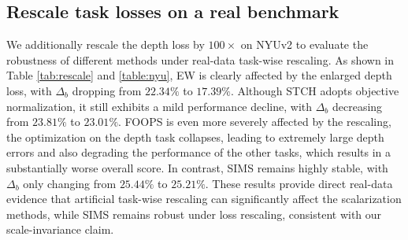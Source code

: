 \documentclass[sigconf]{acmart}
\begin{document}
\begin{add}
\subsection{Rescale task losses on a real benchmark}
We additionally rescale the depth loss by $100\times$ on NYUv2 to evaluate the robustness of different methods under real-data task-wise rescaling. As shown in Table \ref{tab:rescale} and \ref{table:nyu}, EW is clearly affected by the enlarged depth loss, with $\Delta_b$ dropping from $22.34\%$ to $17.39\%$. Although STCH adopts objective normalization, it still exhibits a mild performance decline, with $\Delta_b$ decreasing from $23.81\%$ to $23.01\%$. FOOPS is even more severely affected by the rescaling, the optimization on the depth task collapses, leading to extremely large depth errors and also degrading the performance of the other tasks, which results in a substantially worse overall score. In contrast, SIMS remains highly stable, with $\Delta_b$ only changing from $25.44\%$ to $25.21\%$. These results provide direct real-data evidence that artificial task-wise rescaling can significantly affect the scalarization methods, while SIMS remains robust under loss rescaling, consistent with our scale-invariance claim.

\end{add}
\end{document}
